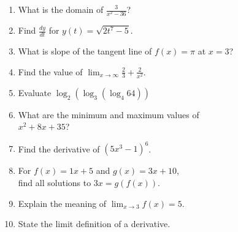 \documentclass[a4paper, 12pt]{article}
\begin{document}
\begin{enumerate}[resume]
        \vspace{1cm}
        \item \underline{\hspace{5cm}} What is the domain of $\frac{3}{x^2 - 36}$?
        \vspace{1cm}
        \item \underline{\hspace{5cm}} Find $\frac{dy}{dt}$ for $y(t) = \sqrt{2t^7 - 5}$.
        \vspace{1cm}
        \item \underline{\hspace{5cm}} What is slope of the tangent line of $f(x) = \pi$ at $x=3$?
        \vspace{1cm}
        \item \underline{\hspace{5cm}} Find the value of $\lim_{x \rightarrow \infty} \frac{2}{3} + \frac{2}{x^2}$.
        \vspace{1cm}
        \item \underline{\hspace{5cm}} Evaluate $\log_2(\log_3(\log_4 64))$
        \vspace{1cm}
        \item \underline{\hspace{5cm}} What are the minimum and maximum values of \\
        \hspace*{5cm} $x^2 + 8x + 35$?
        \vspace{1cm}
        \item \underline{\hspace{5cm}} Find the derivative of $(5x^3 -1)^6$.
        \vspace{1cm}
        \item \underline{\hspace{5cm}} For $f(x) = 1x + 5$ and $g(x) = 3x + 10$, \\
        \hspace*{5cm} find all solutions to $3x = g(f(x))$.
        \vspace{1cm}
        \item Explain the meaning of $\lim_{x \rightarrow 3} f(x) = 5$.
        \vspace{2cm}
        \item State the limit definition of a derivative.
        \vspace{2cm}
\end{enumerate}
\end{document}
